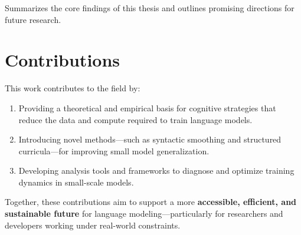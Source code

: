 Summarizes the core findings of this thesis and outlines promising directions for future research.

\section*{Contributions}

This work contributes to the field by:

\begin{enumerate}
    \item Providing a theoretical and empirical basis for cognitive strategies that reduce the data and compute required to train language models.
    \item Introducing novel methods—such as syntactic smoothing and structured curricula—for improving small model generalization.
    \item Developing analysis tools and frameworks to diagnose and optimize training dynamics in small-scale models.
\end{enumerate}

Together, these contributions aim to support a more \textbf{accessible, efficient, and sustainable future} for language modeling—particularly for researchers and developers working under real-world constraints.
